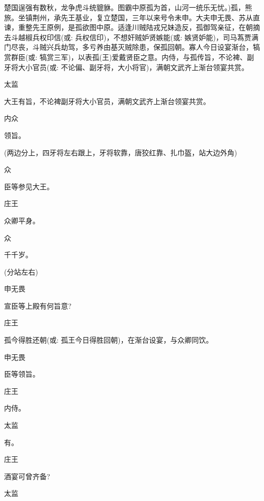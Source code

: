 {楚国逞强有数秋，龙争虎斗统貔貅。图霸中原孤为首，山河一统乐无忧。)孤，熊旅。坐镇荆州，承先王基业，复立楚国，三年以来号令未申。大夫申无畏、苏从直谏，重整先王原例，是孤欲图中原。适逢川贼陆戎兄妹造反，孤御驾亲征，在朝摘去斗越椒兵权印信({\akai 或}: 兵权信印)，不想奸贼妒贤嫉能({\akai 或}: 嫉贤妒能)，司马蒍贾满门尽丧，斗贼兴兵劫驾，多亏养由基灭贼除患，保孤回朝。寡人今日设宴渐台，犒赏群臣({\akai 或}: 犒赏三军)，以表孤(王)爱戴贤臣之意。内侍，与孤传旨，不论裨、副牙将大小官员({\akai 或}: 不论偏、副牙将，大小将官)，满朝文武齐上渐台领宴共赏。

太监\hspace{30pt}~

大王有旨，不论裨副牙将大小官员，满朝文武齐上渐台领宴共赏。

内众\hspace{30pt}~

领旨。

(两边分上，四牙将左右跟上，牙将软靠，唐狡红靠、扎巾盔，站大边外角)

众\hspace{40pt}~

臣等参见大王。

庄王\hspace{30pt}~

众卿平身。

众\hspace{40pt}~

千千岁。

(分站左右)

申无畏\hspace{20pt}~

宣臣等上殿有何旨意?

庄王\hspace{30pt}~

孤今得胜还朝({\akai 或}: 孤王今日得胜回朝)，在渐台设宴，与众卿同饮。

申无畏\hspace{20pt}~

臣等领旨。

庄王\hspace{30pt}~

内侍。

太监\hspace{30pt}~

有。

庄王\hspace{30pt}~

酒宴可曾齐备?

太监\hspace{30pt}~

}
